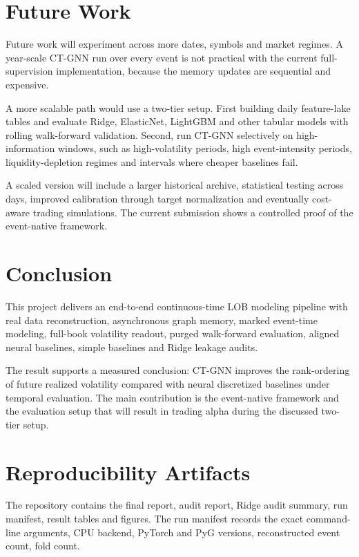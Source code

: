\documentclass[11pt]{article}
\begin{document}
\section{Future Work}

Future work will experiment across more dates, symbols and market regimes. A year-scale CT-GNN run over every event is not practical with the current full-supervision implementation, because the memory updates are sequential and expensive.

A more scalable path would use a two-tier setup. First building daily feature-lake tables and evaluate Ridge, ElasticNet, LightGBM and other tabular models with rolling walk-forward validation. Second, run CT-GNN selectively on high-information windows, such as high-volatility periods, high event-intensity periods, liquidity-depletion regimes and intervals where cheaper baselines fail.

A scaled version will include a larger historical archive, statistical testing across days, improved calibration through target normalization and eventually cost-aware trading simulations. The current submission shows a controlled proof of the event-native framework.

\section{Conclusion}

This project delivers an end-to-end continuous-time LOB modeling pipeline with real data reconstruction, asynchronous graph memory, marked event-time modeling, full-book volatility readout, purged walk-forward evaluation, aligned neural baselines, simple baselines and Ridge leakage audits.

The result supports a measured conclusion: CT-GNN improves the rank-ordering of future realized volatility compared with neural discretized baselines under temporal evaluation. The main contribution is the event-native framework and the evaluation setup that will result in trading alpha during the discussed two-tier setup.

\appendix

\section{Reproducibility Artifacts}

The repository contains the final report, audit report, Ridge audit summary, run manifest, result tables and figures. The run manifest records the exact command-line arguments, CPU backend, PyTorch and PyG versions, reconstructed event count, fold count.
\end{document}
